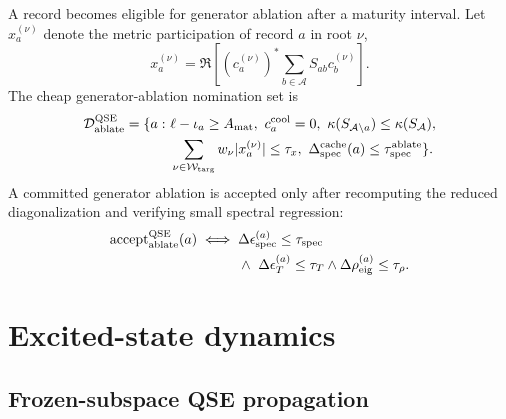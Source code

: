 \documentclass[
  reprint,
  amsmath,
  amssymb,
  aps,
  pra,
  nofootinbib,
  superscriptaddress,
  floatfix
]{revtex4-2}
\newcommand{\Acal}{\mathcal{A}}
\newcommand{\Wcal}{\mathcal{W}}
\newcommand{\Dcal}{\mathcal{D}}
\newcommand{\qse}{\mathrm{QSE}}
\begin{document}
A record becomes eligible for generator ablation after a maturity interval.  Let $x_a^{(\nu)}$ denote the metric participation of record $a$ in root $\nu$,
\begin{equation}
x_a^{(\nu)}
=
\Re\left[
(c_a^{(\nu)})^\ast
\sum_{b\in\Acal}S_{ab}c_b^{(\nu)}
\right].
\label{eq:qse_record_participation}
\end{equation}
The cheap generator-ablation nomination set is
\begin{equation}
\begin{aligned}
\Dcal_{\rm ablate}^{\qse}
=\{a:\ &\ell-\iota_a\ge A_{\rm mat},\
c_a^{\rm cool}=0,\ \kappa(S_{\Acal\setminus a})\le \kappa(S_{\Acal}),\\
&\sum_{\nu\in\Wcal_{\rm targ}}w_\nu |x_a^{(\nu)}|\le\tau_x,\
\Delta_{\rm spec}^{\rm cache}(a)\le\tau_{\rm spec}^{\rm ablate}\}.
\end{aligned}
\label{eq:qse_ablate_candidates}
\end{equation}
A committed generator ablation is accepted only after recomputing the reduced diagonalization and verifying small spectral regression:
\begin{equation}
\begin{aligned}
\operatorname{accept}_{\rm ablate}^{\qse}(a)
\iff{}&
\Delta\epsilon_{\rm spec}^{(a)}\le\tau_{\rm spec}
\\
&\wedge\
\Delta\epsilon_T^{(a)}\le\tau_T
\wedge
\Delta\rho_{\rm eig}^{(a)}\le\tau_\rho .
\end{aligned}
\label{eq:qse_ablate_accept}
\end{equation}

\section{Excited-state dynamics}
\label{sec:excited_dynamics_method}

\subsection{Frozen-subspace QSE propagation}
\end{document}
